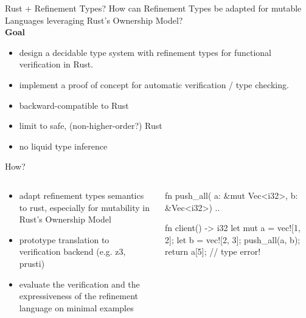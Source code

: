 \documentclass{sdqbeamer}
\begin{document}
\begin{frame}{Rust + Refinement Types?}
  How can Refinement Types be adapted for mutable Languages leveraging Rust's  Ownership Model?
  \vspace{1em}\\
  \textbf{Goal}
  \begin{itemize}
    \item design a decidable type system with refinement types for functional verification in Rust.
    \item implement a proof of concept for automatic verification / type checking.
    \item backward-compatible to Rust
    \item limit to safe, (non-higher-order?) Rust
    \item no liquid type inference
  \end{itemize}
\end{frame}

\begin{frame}[fragile=singleslide]{How?}
  \begin{columns}[T] %
    \begin{column}{.6\textwidth}
      \begin{itemize}
        \item adapt refinement types semantics to rust, especially for mutability in Rust's Ownership Model
        \item prototype translation to verification backend (e.g. z3, prusti)
        \item evaluate the verification and the expressiveness of the refinement language on minimal examples
      \end{itemize}
    \end{column}%
    \hfill%
      \begin{column}{.38\textwidth}
        \begin{rustcode}
          fn push_all(
              a: &mut Vec<i32>, 
              b: &Vec<i32>) {
                ..
          }

          fn client() -> i32 {
            let mut a = vec![1, 2];
            let b = vec![2, 3];
            push_all(a, b);
            return a[5]; // type error!
          }
        \end{rustcode}
      \end{column}%
    \end{columns}
  
  
\end{frame}
\end{document}
